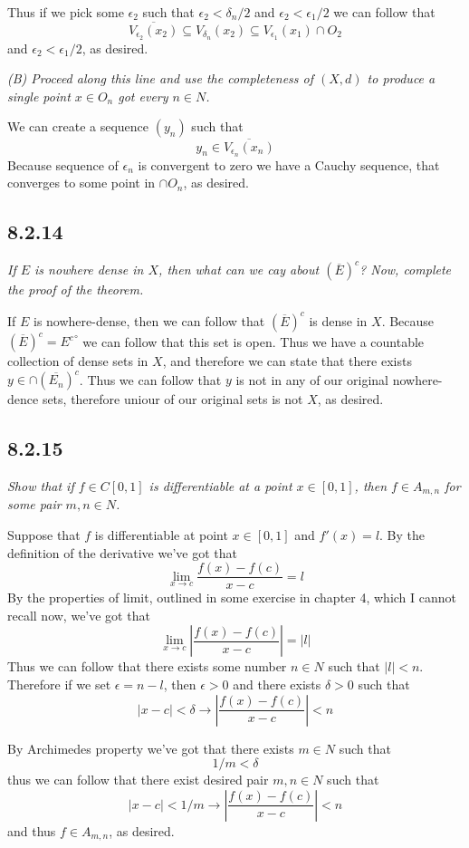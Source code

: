 \documentclass[11pt,oneside,titlepage]{book}
\begin{document}
Thus if we pick some $\epsilon_2$ such that $\epsilon_2 < \delta_n/2$ and
$\epsilon_2 < \epsilon_1/2$
we can follow that
$$\overline{V_{\epsilon_2}(x_2)} \subseteq V_{\delta_n}(x_2) \subseteq V_{\epsilon_1}(x_1) \cap O_2$$
and $\epsilon_2 < \epsilon_1/2$, as desired.

\textit{(B) Proceed along this line and use the completeness of $(X, d)$ to produce a single
  point $x \in O_n$ got every $n \in N$.}

We can create a sequence $(y_n)$ such that
$$y_n \in \overline{V_{\epsilon_n}(x_n)}$$
Because sequence of  $\epsilon_n$ is convergent to zero we have a Cauchy sequence, that
converges to some point in $\cap O_n$, as desired.

\subsection*{8.2.14}
\textit{If $E$ is nowhere dense in $X$, then what can we cay about $(\overline{E})^c$?
  Now, complete the proof of the theorem.}

If $E$ is nowhere-dense, then we can follow that $(\overline{E})^c$ is dense in $X$. Because
$(\overline{E})^c = {E^c}^\circ$ we can follow that this set is open. Thus we have a
countable collection of dense sets in $X$, and therefore we can state that there
exists $y \in \cap (\overline{E_n})^c$. Thus we can follow that $y$ is not in any of our
original nowhere-dence sets, therefore uniour of our original sets is not $X$, as desired.


\subsection*{8.2.15}
\textit{Show that if $f \in C[0, 1]$ is differentiable at a point $x \in [0, 1]$, then
  $f \in A_{m, n}$ for some pair $m, n \in N$.}

Suppose that $f$ is differentiable at point $x \in [0, 1]$ and $f'(x) = l$.
By the definition of the derivative we've got that
$$\lim_{x \to c}{\frac{f(x) - f(c)}{x - c}} = l$$
By the properties of limit, outlined in some exercise in chapter 4, which I cannot recall
now, we've got that
$$\lim_{x \to c}{\left|\frac{f(x) - f(c)}{x - c}\right|} = |l|$$
Thus we can follow that there exists some number $n \in N$ such that $|l| < n$.
Therefore if we set $\epsilon = n - l$, then $\epsilon > 0$ and there exists
$\delta > 0$ such that
$$|x - c| < \delta \to \left|\frac{f(x) - f(c)}{x - c}\right| < n$$

By Archimedes property we've got that there exists $m \in N$ such that
$$1/m < \delta $$
thus we can follow that there exist desired pair $m, n \in N$ such that 
$$|x - c| < 1/m  \to \left|\frac{f(x) - f(c)}{x - c}\right| < n$$
and thus $f \in A_{m, n}$, as desired.
\end{document}
